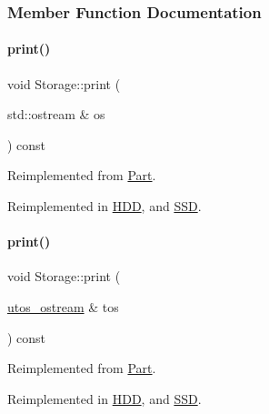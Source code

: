 \subsubsection{Member Function Documentation}
\mbox{\label{class_storage_aa9f6ffb0fd45839b54bd4e254270445d}} 
\paragraph{\texorpdfstring{print()}{print()}\hspace{0.1cm}{\footnotesize\ttfamily [1/2]}}
{\footnotesize\ttfamily void Storage\+::print (\begin{DoxyParamCaption}\item[{std\+::ostream \&}]{os }\end{DoxyParamCaption}) const\hspace{0.3cm}{\ttfamily [virtual]}}



Reimplemented from \mbox{\hyperlink{class_part_a4fa402b8e8fd4236ff773a7697ab2bc3}{Part}}.



Reimplemented in \mbox{\hyperlink{class_h_d_d_a07c34356018542934a4dd91ce38b0821}{H\+DD}}, and \mbox{\hyperlink{class_s_s_d_a3c07aa0fd7bb547cfb4a775513e427a9}{S\+SD}}.

\mbox{\label{class_storage_ab7ecf9e0777891b4e1a84bbf391a1cd4}} 
\paragraph{\texorpdfstring{print()}{print()}\hspace{0.1cm}{\footnotesize\ttfamily [2/2]}}
{\footnotesize\ttfamily void Storage\+::print (\begin{DoxyParamCaption}\item[{\mbox{\hyperlink{structutos__ostream}{utos\+\_\+ostream}} \&}]{tos }\end{DoxyParamCaption}) const\hspace{0.3cm}{\ttfamily [virtual]}}



Reimplemented from \mbox{\hyperlink{class_part_a9ecabe44ba3415badf82c6a23617a41e}{Part}}.



Reimplemented in \mbox{\hyperlink{class_h_d_d_aca2c2583fa3304917905cd9185b64539}{H\+DD}}, and \mbox{\hyperlink{class_s_s_d_ab07086e302f8be99cfa757583d2017a0}{S\+SD}}.



